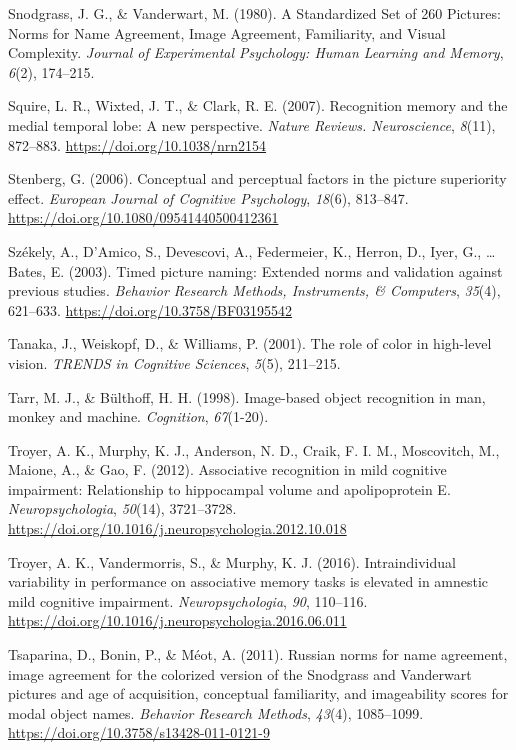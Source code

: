 \documentclass[
  11pt,
]{article}
\begin{document}
\leavevmode\hypertarget{ref-snodgrass1980}{}%
Snodgrass, J. G., \& Vanderwart, M. (1980). A Standardized Set of 260
Pictures: Norms for Name Agreement, Image Agreement, Familiarity, and
Visual Complexity. \emph{Journal of Experimental Psychology: Human
Learning and Memory}, \emph{6}(2), 174--215.

\leavevmode\hypertarget{ref-squire2007}{}%
Squire, L. R., Wixted, J. T., \& Clark, R. E. (2007). Recognition memory
and the medial temporal lobe: A new perspective. \emph{Nature Reviews.
Neuroscience}, \emph{8}(11), 872--883.
\url{https://doi.org/10.1038/nrn2154}

\leavevmode\hypertarget{ref-stenberg2006}{}%
Stenberg, G. (2006). Conceptual and perceptual factors in the picture
superiority effect. \emph{European Journal of Cognitive Psychology},
\emph{18}(6), 813--847. \url{https://doi.org/10.1080/09541440500412361}

\leavevmode\hypertarget{ref-szekely2003}{}%
Székely, A., D'Amico, S., Devescovi, A., Federmeier, K., Herron, D.,
Iyer, G., \ldots{} Bates, E. (2003). Timed picture naming: Extended
norms and validation against previous studies. \emph{Behavior Research
Methods, Instruments, \& Computers}, \emph{35}(4), 621--633.
\url{https://doi.org/10.3758/BF03195542}

\leavevmode\hypertarget{ref-tanaka2001}{}%
Tanaka, J., Weiskopf, D., \& Williams, P. (2001). The role of color in
high-level vision. \emph{TRENDS in Cognitive Sciences}, \emph{5}(5),
211--215.

\leavevmode\hypertarget{ref-tarr1998}{}%
Tarr, M. J., \& Bülthoff, H. H. (1998). Image-based object recognition
in man, monkey and machine. \emph{Cognition}, \emph{67}(1-20).

\leavevmode\hypertarget{ref-troyer2012}{}%
Troyer, A. K., Murphy, K. J., Anderson, N. D., Craik, F. I. M.,
Moscovitch, M., Maione, A., \& Gao, F. (2012). Associative recognition
in mild cognitive impairment: Relationship to hippocampal volume and
apolipoprotein E. \emph{Neuropsychologia}, \emph{50}(14), 3721--3728.
\url{https://doi.org/10.1016/j.neuropsychologia.2012.10.018}

\leavevmode\hypertarget{ref-troyer2016}{}%
Troyer, A. K., Vandermorris, S., \& Murphy, K. J. (2016).
Intraindividual variability in performance on associative memory tasks
is elevated in amnestic mild cognitive impairment.
\emph{Neuropsychologia}, \emph{90}, 110--116.
\url{https://doi.org/10.1016/j.neuropsychologia.2016.06.011}

\leavevmode\hypertarget{ref-tsaparina2011}{}%
Tsaparina, D., Bonin, P., \& Méot, A. (2011). Russian norms for name
agreement, image agreement for the colorized version of the Snodgrass
and Vanderwart pictures and age of acquisition, conceptual familiarity,
and imageability scores for modal object names. \emph{Behavior Research
Methods}, \emph{43}(4), 1085--1099.
\url{https://doi.org/10.3758/s13428-011-0121-9}
\end{document}

